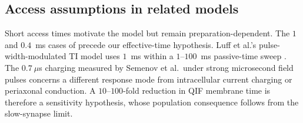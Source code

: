 \subsection{Access assumptions in related models}
Short access times motivate the model but remain preparation-dependent.
The $1$ and $0.4$~ms cases of \cite{esmaeilpour2021} precede our effective-time
hypothesis. Luff et al.'s pulse-width-modulated TI model uses $1$~ms within a
$1$--$100$~ms passive-time sweep \cite{luff2024}. The $0.7~\mu$s charging
measured by Semenov et al.\ under strong microsecond field pulses
\cite{semenov2025} concerns a different response mode from intracellular
current charging or periaxonal conduction. A $10$--$100$-fold reduction in
QIF membrane time is therefore a sensitivity hypothesis, whose population
consequence follows from the slow-synapse limit.
